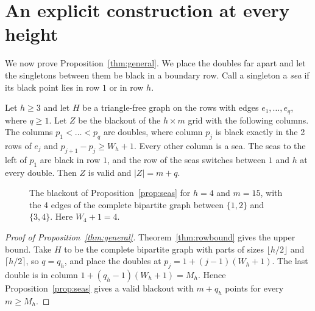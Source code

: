 \section{An explicit construction at every height}\label{sec:general}

We now prove Proposition~\ref{thm:general}. We place the doubles far apart and let the
singletons between them be black in a boundary row. Call a singleton a \emph{sea} if its
black point lies in row $1$ or in row $h$.

\begin{proposition}\label{prop:seas}
Let $h\ge3$ and let $H$ be a triangle-free graph on the rows with edges $e_1,\dots,e_q$,
where $q\ge1$. Let $Z$ be the blackout of the $h\times m$ grid with the following columns.
The columns $p_1<\dots<p_q$ are doubles, where column $p_j$ is black exactly in the 2 rows
of $e_j$ and $p_{j+1}-p_j\ge W_h+1$. Every other column is a sea. The seas to the left of
$p_1$ are black in row $1$, and the row of the seas switches between $1$ and $h$ at every
double. Then $Z$ is valid and $|Z|=m+q$.
\end{proposition}

\begin{figure}[ht]
\centering

\caption{The blackout of Proposition~\ref{prop:seas} for $h=4$ and $m=15$, with the 4 edges
of the complete bipartite graph between $\{1,2\}$ and $\{3,4\}$. Here $W_4+1=4$.}
\label{fig:seas}
\end{figure}

\begin{proof}[Proof of Proposition~\ref{thm:general}]
Theorem~\ref{thm:rowbound} gives the upper bound. Take $H$ to be the complete bipartite
graph with parts of sizes $\lfloor h/2\rfloor$ and $\lceil h/2\rceil$, so $q=q_h$, and
place the doubles at $p_j=1+(j-1)(W_h+1)$. The last double is in column
$1+(q_h-1)(W_h+1)=M_h$. Hence Proposition~\ref{prop:seas} gives a valid blackout with
$m+q_h$ points for every $m\ge M_h$.
\end{proof}

